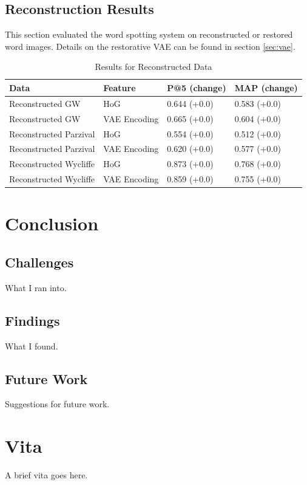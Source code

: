 \documentclass[final]{ukthesis}
\begin{document}
%
%
\section{Reconstruction Results}
This section evaluated the word spotting system on reconstructed or restored word images. Details on the restorative VAE can be found in section \ref{sec:vae}.

\begin{table}[h]
\centering
\begin{tabular}{llll}
\textbf{Data}  & \textbf{Feature} & \textbf{P@5 (change)} & \textbf{MAP (change)} \\
\hline
Reconstructed GW    & HoG			& 0.644 (+0.0)          & 0.583 (+0.0)         \\
Reconstructed GW    & VAE Encoding 	& 0.665 (+0.0)         & 0.604 (+0.0)         \\
Reconstructed Parzival & HoG                     & 0.554 (+0.0)         & 0.512 (+0.0)         \\
Reconstructed Parzival & VAE Encoding 	& 0.620 (+0.0)         & 0.577 (+0.0)         \\
Reconstructed Wycliffe & HoG                     & 0.873 (+0.0)         & 0.768 (+0.0)         \\
Reconstructed Wycliffe & VAE Encoding 	& 0.859 (+0.0)         & 0.755 (+0.0)         \\
\end{tabular}
\caption{Results for Reconstructed Data}
\label{my-label}
\end{table}





%
%
%
\chapter{Conclusion}

\section{Challenges}
What I ran into.

\section{Findings}
What I found.

\section{Future Work}
Suggestions for future work.




\copyrightnotice
\backmatter

\chapter{Vita}
A brief vita goes here.
\end{document}
